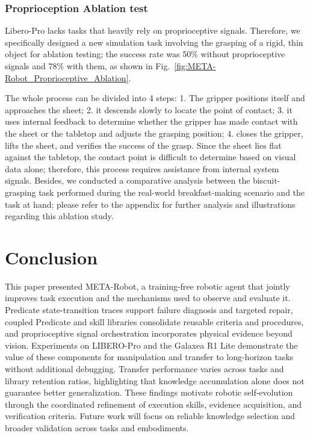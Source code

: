 \documentclass{article} %
\begin{document}
\subsubsection{Proprioception Ablation test}
Libero-Pro lacks tasks that heavily rely on proprioceptive signals. Therefore, we specifically designed a new simulation task involving the grasping of a rigid, thin object for ablation testing; the success rate was 50\% without proprioceptive signals and 78\% with them, as shown in Fig.~\ref{fig:META-Robot_Proprioceptive_Ablation}.

The whole process can be divided into 4 steps: 1. The gripper positions itself and approaches the sheet; 2. it descends slowly to locate the point of contact; 3. it uses internal feedback to determine whether the gripper has made contact with the sheet or the tabletop and adjusts the grasping position; 4. closes the gripper, lifts the sheet, and verifies the success of the grasp. Since the sheet lies flat against the tabletop, the contact point is difficult to determine based on visual data alone; therefore, this process requires assistance from internal system signals. Besides, we conducted a comparative analysis between the biscuit-grasping task performed during the real-world breakfast-making scenario and the task at hand; please refer to the appendix for further analysis and illustrations regarding this ablation study.


\section{Conclusion}
This paper presented META-Robot, a training-free robotic agent that jointly improves task execution and the mechanisms used to observe and evaluate it. Predicate state-transition traces support failure diagnosis and targeted repair, coupled Predicate and skill libraries consolidate reusable criteria and procedures, and proprioceptive signal orchestration incorporates physical evidence beyond vision. Experiments on LIBERO-Pro and the Galaxea R1 Lite demonstrate the value of these components for manipulation and transfer to long-horizon tasks without additional debugging. Transfer performance varies across tasks and library retention ratios, highlighting that knowledge accumulation alone does not guarantee better generalization. These findings motivate robotic self-evolution through the coordinated refinement of execution skills, evidence acquisition, and verification criteria. Future work will focus on reliable knowledge selection and broader validation across tasks and embodiments.
\label{headings}


\end{document}
